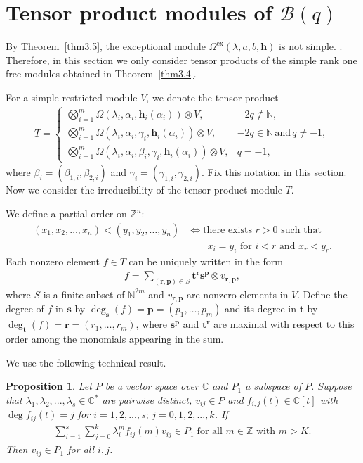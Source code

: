 \documentclass[a4paper]{amsart}
\numberwithin{equation}{section}
\newtheorem{proposition}[theorem]{Proposition}
\begin{document}
\section{Tensor product modules of $\mathcal{B}(q)$}
By Theorem~\ref{thm3.5}, the exceptional module
	$\Omega^{\mathrm{ex}}(\lambda,a,b,\mathbf h)$ is not simple. .
Therefore, in this section we only consider tensor products of the simple
rank one free modules obtained in Theorem~\ref{thm3.4}.

For a simple restricted module $V$, we denote the tensor product 
\begin{align*}
T=
\begin{cases}
\bigotimes_{i=1}^{m}\Omega(\lambda_{i},\alpha_{i},\mathbf{h}_{i}(\alpha_i))\otimes V, & -2q\notin \mathbb{N},\\
\bigotimes_{i=1}^{m}\Omega(\lambda_{i},\alpha_{i},\gamma_{i},\mathbf{h}_{i}(\alpha_i))\otimes V, & -2q \in \mathbb{N} \,\text{and} \,q\neq -1,\\
\bigotimes_{i=1}^{m}\Omega(\lambda_{i},\alpha_{i},\beta_{i},\gamma_{i},\mathbf{h}_{i}(\alpha_i))\otimes V, & q=-1,
\end{cases}
\end{align*}
where
$\beta_i=(\beta_{1,i},\beta_{2,i})$ and
$\gamma_i=(\gamma_{1,i},\gamma_{2,i})$. Fix this notation in this section. Now we consider the irreducibility of the tensor product module $T$.

We define a partial order on $\mathbb{Z}^{n}$:
\begin{align*}
(x_{1},x_{2},\ldots,x_{n})<(y_{1},y_{2},\ldots,y_{n})
&\iff \text{there exists }r>0\text{ such that}\\
&\qquad x_{i}=y_{i}\text{ for }i<r\text{ and }x_{r}<y_{r}.
\end{align*}
Each nonzero element $f\in T$ can be uniquely written in the form
\begin{align*}
    f=\sum_{(\mathbf r,\mathbf p)\in S}\mathbf t^{\mathbf r}\mathbf s^{\mathbf p}\otimes v_{\mathbf r,\mathbf p},
\end{align*}
where $S$ is a finite subset of $\mathbb{N}^{2m}$ and $v_{\mathbf r,\mathbf p}$ are nonzero elements in $V$. Define the degree of $f$ in $\mathbf s$ by $\deg_{\mathbf s}(f)=\mathbf p=(p_{1},\ldots,p_{m})$ and its degree in $\mathbf t$ by $\deg_{\mathbf t}(f)=\mathbf r=(r_{1},\ldots,r_{m})$, where $\mathbf s^{\mathbf p}$ and $\mathbf t^{\mathbf r}$ are maximal with respect to this order among the monomials appearing in the sum.


We use the following technical result.
\begin{proposition}\label{prop4.1}
   Let $P$ be a vector space over $\mathbb{C}$ and $P_{1}$ a subspace of $P$. Suppose that $\lambda_{1},\lambda_{2},...,\lambda_{s}\in\mathbb{C}^{*}$ are pairwise distinct, $v_{ij}\in P$ and $f_{i,j}(t)\in \mathbb{C}[t]$ with $\deg f_{ij}(t)=j$ for $i=1,2,...,s;\,j=0,1,2,...,k$. If 
   \begin{align*}
       \sum_{i=1}^{s}\sum_{j=0}^{k}\lambda_{i}^{m}f_{ij}(m)v_{ij}\in P_{1} \;\text{for all }m\in\mathbb{Z}\text{ with }m>K.
   \end{align*}
   Then $v_{ij}\in P_{1}$ for all $i,j$.
\end{proposition}
\end{document}
